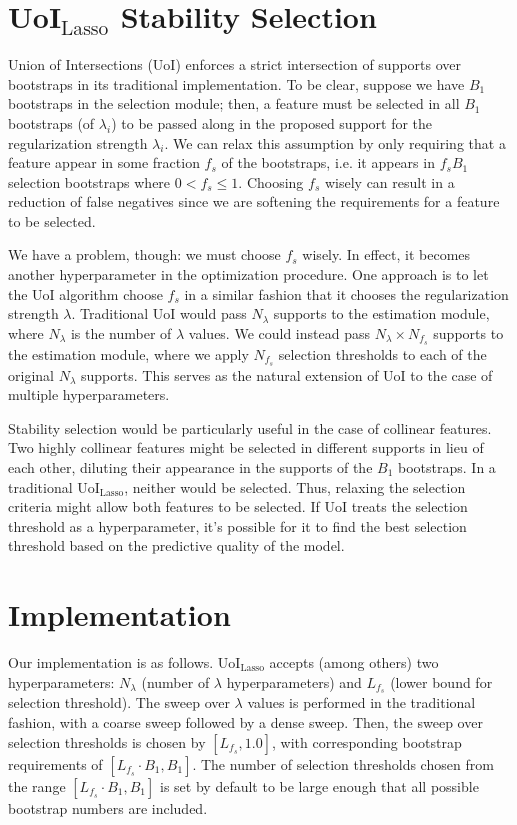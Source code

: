 \documentclass[11pt]{article}
\begin{document}
\section{UoI$_\text{Lasso}$ Stability Selection}
	Union of Intersections (UoI) enforces a strict intersection of supports over bootstraps in its traditional implementation. To be clear, suppose we have $B_1$ bootstraps in the selection module; then, a feature must be selected in all $B_1$ bootstraps (of $\lambda_i$) to be passed along in the proposed support for the regularization strength $\lambda_i$. We can relax this assumption by only requiring that a feature appear in some fraction $f_s$ of the bootstraps, i.e. it appears in $f_s B_1$ selection bootstraps where $0 < f_s \leq 1$. Choosing $f_s$ wisely can result in a reduction of false negatives since we are softening the requirements for a feature to be selected.
	
	We have a problem, though: we must choose $f_s$ wisely. In effect, it becomes another hyperparameter in the optimization procedure. One approach is to let the UoI algorithm choose $f_s$ in a similar fashion that it chooses the regularization strength $\lambda$. Traditional UoI would pass $N_{\lambda}$ supports to the estimation module, where $N_{\lambda}$ is the number of $\lambda$ values. We could instead pass $N_{\lambda} \times N_{f_s}$ supports to the estimation module, where we apply $N_{f_s}$ selection thresholds to each of the original $N_{\lambda}$ supports. This serves as the natural extension of UoI to the case of multiple hyperparameters.
	
	Stability selection would be particularly useful in the case of collinear features. Two highly collinear features might be selected in different supports in lieu of each other, diluting their appearance in the supports of the $B_1$ bootstraps. In a traditional UoI$_{\text{Lasso}}$, neither would be selected. Thus, relaxing the selection criteria might allow both features to be selected. If UoI treats the selection threshold as a hyperparameter, it's possible for it to find the best selection threshold based on the predictive quality of the model.

\section{Implementation}
	Our implementation is as follows. UoI$_{\text{Lasso}}$ accepts (among others) two hyperparameters: $N_{\lambda}$ (number of $\lambda$ hyperparameters) and $L_{f_s}$ (lower bound for selection threshold). The sweep over $\lambda$ values is performed in the traditional fashion, with a coarse sweep followed by a dense sweep. Then, the sweep over selection thresholds is chosen by $\left[L_{f_s}, 1.0\right]$, with corresponding bootstrap requirements of $\left[L_{f_s}\cdot B_1, B_1\right]$. The number of selection thresholds chosen from the range $\left[L_{f_s}\cdot B_1, B_1\right]$ is set by default to be large enough that all possible bootstrap numbers are included. 
	
\end{document}
